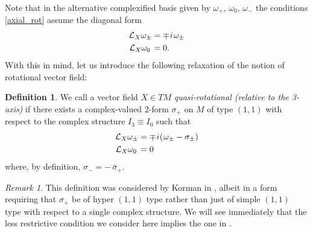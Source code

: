 \documentclass[11pt]{amsart}
\theoremstyle{remark}
\newtheorem*{remark}{Remark}
\theoremstyle{remark}
\theoremstyle{definition}
\newtheorem*{definition}{Definition}
\theoremstyle{definition}
\theoremstyle{definition}
\newcommand{\0}{{\scriptstyle 0'}} %
\newcommand{\1}{{\scriptstyle 1'}}
\newcommand{\pt}{\hspace{1pt}} %
\newcommand{\hp}{\hspace{0.5pt}} %
\begin{document}
Note that in the alternative complexified basis given by $\omega_+$, $\omega_0$, $\omega_-$ the conditions \eqref{axial_rot} assume the diagonal form 
\begin{equation} \label{eigenform}
\begin{aligned}
\mathcal{L}_X\omega_{\pm} & = \mp \hp i \pt \omega_{\pm}  \\
\mathcal{L}_X\omega_0 \, & = 0 \rlap{.}
\end{aligned}
\end{equation}
With this in mind, let us introduce the following relaxation of the notion of rotational vector field:  

\begin{definition}
We call a vector field $X \in TM$ \textit{quasi-rotational (relative to the 3-axis)} if there exists a complex-valued 2-form $\sigma_+$ on $M$ of type $(1,1)$ with respect to the complex structure $I_3 \equiv I_0$ such that
\begin{equation} \label{quasi_rot}
\begin{aligned}
\mathcal{L}_X\omega_{\pm} & = \mp \hp i \hp (\hp \omega_{\pm} - \sigma_{\pm}) \\[0pt]
\mathcal{L}_X\omega_0 \, & = 0 
\end{aligned}
\end{equation}
where, by definition, $\sigma_- = - \, \bar{\sigma}_+$.
\end{definition}

\begin{remark}
This definition was considered by Korman in \cite{MR3625762}, albeit in a form requiring that $\sigma_+$ be of hyper $(1,1)$ type rather than just of simple $(1,1)$ type with respect to a single complex structure. We will see immediately that the less restrictive condition we consider here implies the one in \cite{MR3625762}.
\end{remark}
\end{document}
